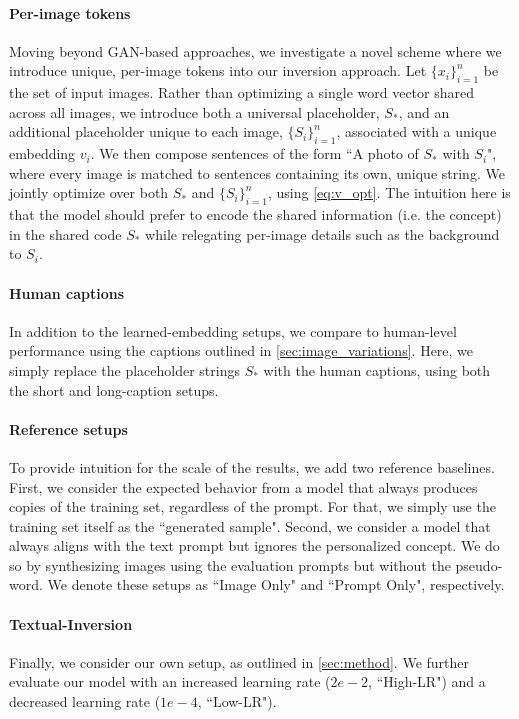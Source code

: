 \paragraph{Per-image tokens} Moving beyond GAN-based approaches, we investigate a novel scheme where we introduce unique, per-image tokens into our inversion approach. Let $\{x_i\}_{i=1}^n$ be the set of input images. Rather than optimizing a single word vector shared across all images, we introduce both a universal placeholder, $S_*$, and an additional placeholder unique to each image, $\{S_i\}_{i=1}^n$, associated with a unique embedding $v_i$. We then compose sentences of the form ``A photo of $S_*$ with $S_i$", where every image is matched to sentences containing its own, unique string. We jointly optimize over both $S_*$ and $\{S_i\}_{i=1}^n$, using \ref{eq:v_opt}. The intuition here is that the model should prefer to encode the shared information (i.e. the concept) in the shared code $S_*$ while relegating per-image details such as the background to $S_i$. 

\paragraph{Human captions} In addition to the learned-embedding setups, we compare to human-level performance using the captions outlined in \ref{sec:image_variations}. Here, we simply replace the placeholder strings $S_*$ with the human captions, using both the short and long-caption setups. 

\paragraph{Reference setups} To provide intuition for the scale of the results, we add two reference baselines. First, we consider the expected behavior from a model that always produces copies of the training set, regardless of the prompt. For that, we simply use the training set itself as the ``generated sample". Second, we consider a model that always aligns with the text prompt but ignores the personalized concept. We do so by synthesizing images using the evaluation prompts but without the pseudo-word. We denote these setups as ``Image Only" and ``Prompt Only", respectively.

\paragraph{Textual-Inversion}
Finally, we consider our own setup, as outlined in \ref{sec:method}. We further evaluate our model with an increased learning rate ($2e-2$, ``High-LR") and a decreased learning rate ($1e-4$, ``Low-LR").

